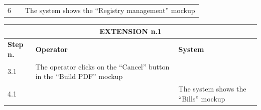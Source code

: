 {{{\begin{center}
\begin{tabular}{|p{2cm}|p{6cm}|p{6cm}|}
				\vspace{1mm} \vspace{1mm} \\
			\hline
				\vspace{1mm} 6\vspace{1mm} &
				\vspace{1mm} \vspace{1mm} & 
				\vspace{1mm} The system shows the “Registry management” mockup\vspace{1mm} \\
			\hline
			\end{tabular}

			\begin{tabular}{|p{2cm}|p{6cm}|p{6cm}|}
			\hline
				\multicolumn{3}{|c|}{EXTENSION n.1}\\
			\hline
				\centering \vspace{1mm} \bfseries{Step n.} \vspace{1mm} & \vspace{1mm} \bfseries{Operator} \vspace{1mm} & \vspace{1mm} \bfseries{System} \vspace{1mm}\\
			\hline
				\vspace{1mm} 3.1\vspace{1mm} &
				\vspace{1mm} The operator clicks on the “Cancel” button in the “Build PDF” mockup \vspace{1mm} & 
				\vspace{1mm} \vspace{1mm} \\
			\hline
				\vspace{1mm} 4.1\vspace{1mm} &
				\vspace{1mm} \vspace{1mm} & 
				\vspace{1mm} The system shows the “Bills” mockup\vspace{1mm} \\
			\hline
			\end{tabular}


\end{center}}}}
